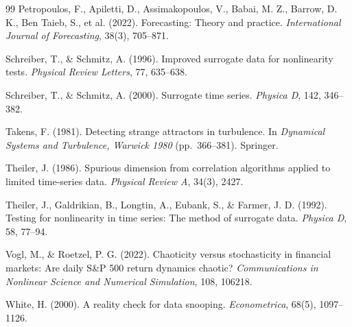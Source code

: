 \documentclass[preprint,12pt]{elsarticle}
\begin{document}
\begin{thebibliography}{99}
 Petropoulos, F., Apiletti, D., Assimakopoulos, V., Babai, M. Z., Barrow, D. K., Ben Taieb, S., et al. (2022). Forecasting: Theory and practice. \emph{International Journal of Forecasting}, 38(3), 705--871.

 Schreiber, T., \& Schmitz, A. (1996). Improved surrogate data for nonlinearity tests. \emph{Physical Review Letters}, 77, 635--638.

 Schreiber, T., \& Schmitz, A. (2000). Surrogate time series. \emph{Physica D}, 142, 346--382.

 Takens, F. (1981). Detecting strange attractors in turbulence. In \emph{Dynamical Systems and Turbulence, Warwick 1980} (pp.\ 366--381). Springer.

 Theiler, J. (1986). Spurious dimension from correlation algorithms applied to limited time-series data. \emph{Physical Review A}, 34(3), 2427.

 Theiler, J., Galdrikian, B., Longtin, A., Eubank, S., \& Farmer, J. D. (1992). Testing for nonlinearity in time series: The method of surrogate data. \emph{Physica D}, 58, 77--94.

 Vogl, M., \& Roetzel, P. G. (2022). Chaoticity versus stochasticity in financial markets: Are daily S\&P 500 return dynamics chaotic? \emph{Communications in Nonlinear Science and Numerical Simulation}, 108, 106218.

 White, H. (2000). A reality check for data snooping. \emph{Econometrica}, 68(5), 1097--1126.

\end{thebibliography}
\end{document}
